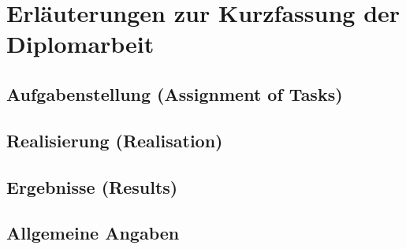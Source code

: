 \chapter				{Erläuterungen zur Kurzfassung der Diplomarbeit}				
	\section			{Aufgabenstellung (Assignment of Tasks)}						
	\section			{Realisierung (Realisation)}									
	\section			{Ergebnisse (Results)}											
	\section			{Allgemeine Angaben}											